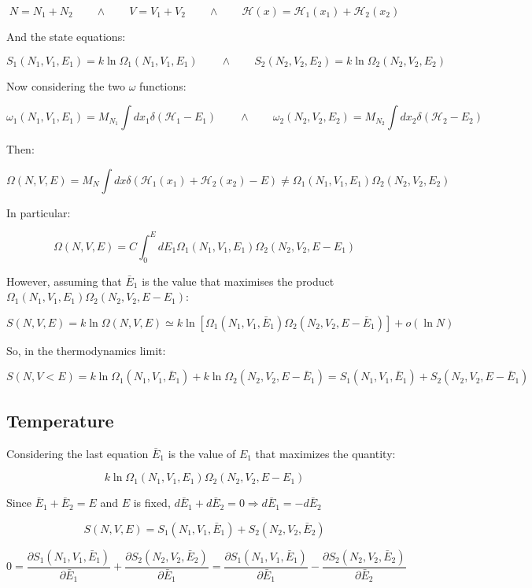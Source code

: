 $$N = N_1+N_2\qquad\land\qquad V = V_1+V_2\qquad\land\qquad\mathcal{H}(x) = \mathcal{H}_1(x_1)+\mathcal{H}_2(x_2)$$

And the state equations:

$$S_1(N_1, V_1, E_1) = k\ln\Omega_1(N_1, V_1, E_1)\qquad\land\qquad S_2(N_2, V_2, E_2) = k\ln\Omega_2(N_2, V_2, E_2)$$

Now considering the two $\omega$ functions:

$$\omega_1(N_1, V_1, E_1) = M_{N_1}\int dx_1\delta(\mathcal{H}_1-E_1)\qquad\land\qquad\omega_2(N_2, V_2, E_2) = M_{N_2}\int dx_2\delta(\mathcal{H}_2-E_2)$$

Then:

$$\Omega(N, V, E) = M_N\int dx\delta(\mathcal{H}_1(x_1) + \mathcal{H}_2(x_2)-E)\neq\Omega_1(N_1, V_1, E_1)\Omega_2(N_2, V_2, E_2)$$

In particular:

$$\Omega(N, V, E) = C\int_0^EdE_1\Omega_1(N_1, V_1, E_1)\Omega_2(N_2, V_2, E - E_1)$$

However, assuming that $\bar{E}_1$ is the value that maximises the product $\Omega_1(N_1, V_1, E_1)\Omega_2(N_2, V_2, E - E_1)$:

$$S(N, V, E) = k\ln\Omega(N, V, E)\simeq k\ln[\Omega_1(N_1, V_1, \bar{E}_1)\Omega_2(N_2, V_2, E-\bar{E}_1)] + o(\ln N)$$

So, in the thermodynamics limit:

$$S(N, V< E) = k\ln\Omega_1(N_1, V_1, \bar{E}_1) + k\ln\Omega_2(N_2, V_2, E-\bar{E}_1) = S_1(N_1, V_1, \bar{E}_1) + S_2(N_2, V_2, E - \bar{E}_1)$$

	\subsection{Temperature}
	Considering the last equation $\bar{E}_1$ is the value of $E_1$ that maximizes the quantity:

	$$k\ln\Omega_1(N_1, V_1, E_1)\Omega_2(N_2, V_2, E - E_1)$$

	Since $\bar{E}_1+\bar{E}_2 = E$ and $E$ is fixed, $d\bar{E}_1 + d\bar{E}_2 = 0\Rightarrow d\bar{E}_1 = -d\bar{E}_2$

	$$S(N, V, E) = S_1(N_1, V_1, \bar{E}_1) + S_2(N_2, V_2, \bar{E}_2)$$

	$$0 = \frac{\partial S_1(N_1, V_1, \bar{E}_1)}{\partial\bar{E}_1} + \frac{\partial S_2(N_2, V_2, \bar{E}_2)}{\partial\bar{E}_1} = \frac{\partial S_1(N_1, V_1, \bar{E}_1)}{\partial\bar{E}_1} - \frac{\partial S_2(N_2, V_2, \bar{E}_2)}{\partial\bar{E}_2}$$

